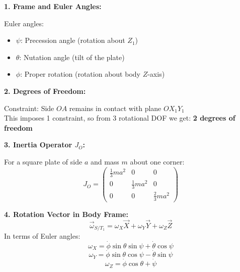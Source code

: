 \documentclass[12pt]{article}
\begin{document}
\begin{correctionbox}
\textbf{1. Frame and Euler Angles:}

\begin{center}
\end{center}

Euler angles:
\begin{itemize}
    \item $\psi$: Precession angle (rotation about $Z_1$)
    \item $\theta$: Nutation angle (tilt of the plate)
    \item $\phi$: Proper rotation (rotation about body $Z$-axis)
\end{itemize}

\textbf{2. Degrees of Freedom:}

Constraint: Side $OA$ remains in contact with plane $OX_1Y_1$\\
This imposes 1 constraint, so from 3 rotational DOF we get: \textbf{2 degrees of freedom}

\textbf{3. Inertia Operator $J_O$:}

For a square plate of side $a$ and mass $m$ about one corner:
\[
J_O = 
\begin{pmatrix}
\frac{1}{3}ma^2 & 0 & 0 \\
0 & \frac{1}{3}ma^2 & 0 \\
0 & 0 & \frac{2}{3}ma^2
\end{pmatrix}
\]

\textbf{4. Rotation Vector in Body Frame:}
\[
\vec{\omega}_{S/T_1} = \omega_X \vec{X} + \omega_Y \vec{Y} + \omega_Z \vec{Z}
\]
In terms of Euler angles:
\[
\omega_X = \dot{\phi} \sin\theta \sin\psi + \dot{\theta} \cos\psi
\]
\[
\omega_Y = \dot{\phi} \sin\theta \cos\psi - \dot{\theta} \sin\psi
\]
\[
\omega_Z = \dot{\phi} \cos\theta + \dot{\psi}
\]


\end{correctionbox}
\end{document}
